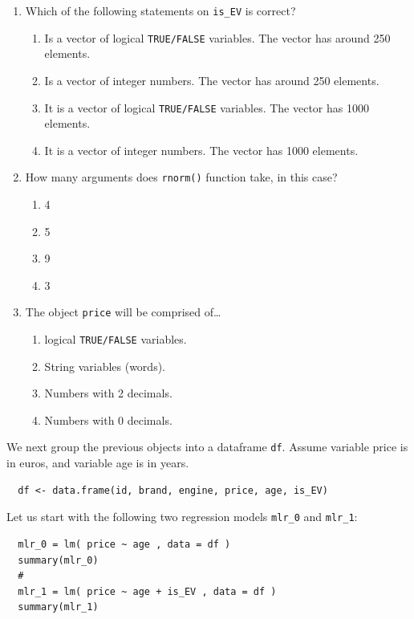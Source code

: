 \documentclass{article}
\begin{document}
\begin{enumerate}[resume]
  \item Which of the following statements on \texttt{is\_EV} is correct?
  \begin{enumerate}[label=\Alph*)]
    \item Is a vector of logical \texttt{TRUE/FALSE} variables. The vector has around 250 elements.
    \item Is a vector of integer numbers. The vector has around 250 elements.
    \item It is a vector of logical \texttt{TRUE/FALSE} variables. The vector has 1000 elements.
    \item It is a vector of integer numbers. The vector has 1000 elements.
  \end{enumerate}
  \item How many arguments does \texttt{rnorm()} function take, in this case?
  \begin{enumerate}[label=\Alph*)]
    \item 4
    \item 5
    \item 9
    \item 3
  \end{enumerate}
  \item The object \texttt{price} will be comprised of\dots
  \begin{enumerate}[label=\Alph*)]
    \item logical \texttt{TRUE/FALSE} variables.
    \item String variables (words).
    \item Numbers with 2 decimals.
    \item Numbers with 0 decimals.
  \end{enumerate}
\end{enumerate}

\newpage

We next group the previous objects into a dataframe \texttt{df}. Assume variable price is in euros, and variable age is in years.

\begin{lstlisting}
  df <- data.frame(id, brand, engine, price, age, is_EV)
\end{lstlisting}

Let us start with the following two regression models \texttt{mlr\_0} and \texttt{mlr\_1}:
\begin{lstlisting}
  mlr_0 = lm( price ~ age , data = df )
  summary(mlr_0)
  #
  mlr_1 = lm( price ~ age + is_EV , data = df )
  summary(mlr_1)
\end{lstlisting}
\end{document}
